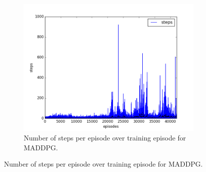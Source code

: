 \begin{figure}[h]
\begin{subfigure}[h]{\figscale\linewidth}
  \end{subfigure}
  ~
  \begin{subfigure}[h]{\figscale\linewidth}
    \includegraphics[trim=10 10 10 10,clip,width=\linewidth]
    {../results/maddpg_1vs2/steps.png}
    \caption{Number of steps per episode over training episode for MADDPG.}
    \label{fig:maddpg-1vs2-steps}
  \end{subfigure}


\end{figure}
